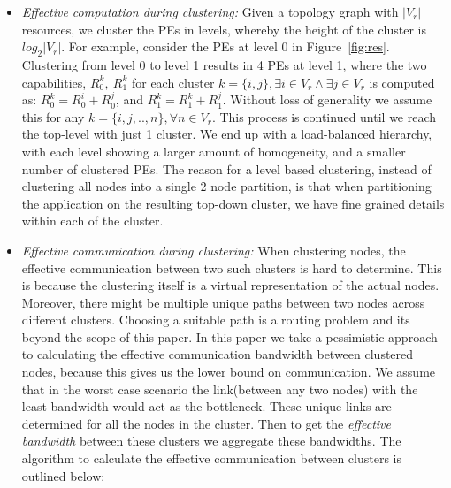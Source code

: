 \begin{itemize}

\item \textit{Effective computation during clustering:} Given a
  topology graph with $|V_r|$ resources, we cluster the PEs in levels,
  whereby the height of the cluster is $log_2|V_r|$. For example,
  consider the PEs at level 0 in Figure~\ref{fig:res}. Clustering from
  level 0 to level 1 results in 4 PEs at level 1, where the two
  capabilities, $R^k_0,\ R^k_1$ for each cluster $k = \{i, j\},
  \exists i \in V_r \wedge \exists j \in V_r$ is computed as: $R^k_0 =
  R^i_0 + R^j_0$, and $R^k_1 = R^k_1 + R^j_1$. Without loss of
  generality we assume this for any $k = \{i,j,..,n\}, \forall n \in
  V_r$. This process is continued until we reach the top-level with just
  1 cluster. We end up with a load-balanced hierarchy, with each
  level showing a larger amount of homogeneity, and a smaller number of
  clustered PEs. The reason for a level based clustering, instead of
  clustering all nodes into a single 2 node partition, is that when
  partitioning the application on the resulting top-down cluster, we
  have fine grained details within each of the cluster.



\item \textit{Effective communication during clustering:} When
  clustering nodes, the effective communication between two such clusters
  is hard to determine. This is because the clustering itself is a
  virtual representation of the actual nodes. Moreover, there might be
  multiple unique paths between two nodes across different
  clusters. Choosing a suitable path is a routing problem and its beyond
  the scope of this paper. In this paper we take a pessimistic approach to
  calculating the effective communication bandwidth between clustered
  nodes, because this gives us the lower bound on communication. We
  assume that in the worst case scenario the link(between any two nodes) with
the least
  bandwidth would act as the bottleneck. These unique links are
  determined for all the nodes in the cluster. Then to get the
  \textit{effective bandwidth} between these clusters we aggregate these
  bandwidths. The algorithm to calculate the effective communication
  between clusters is outlined below:


\end{itemize}
